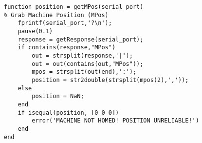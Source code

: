 \begin{lstlisting}
function position = getMPos(serial_port)
% Grab Machine Position (MPos)
    fprintf(serial_port,'?\n');
    pause(0.1)
    response = getResponse(serial_port);
    if contains(response,"MPos")
        out = strsplit(response,'|');
        out = out(contains(out,"MPos"));
        mpos = strsplit(out(end),':');
        position = str2double(strsplit(mpos(2),','));
    else
        position = NaN;
    end
    if isequal(position, [0 0 0])
        error('MACHINE NOT HOMED! POSITION UNRELIABLE!')
    end
end

\end{lstlisting}